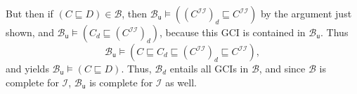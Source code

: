 But then if $(C \sqsubseteq D) \in \mathcal{B}$, then $\mathcal{B}_{\mathsf{u}} \models (
(C^{\mathcal{I}\mathcal{I}})_d \sqsubseteq C^{\mathcal{I}\mathcal{I}})$ by the argument
just shown, and $\mathcal{B}_{\mathsf{u}} \models ( C_d \sqsubseteq
(C^{\mathcal{I}\mathcal{I}})_d )$, because this GCI is contained in
$\mathcal{B}_{\mathsf{u}}$.  Thus
\begin{equation*}
  \mathcal{B}_{\mathsf{u}} \models ( C \sqsubseteq C_d \sqsubseteq (C^{\mathcal{I}\mathcal{I}})_d
  \sqsubseteq C^{\mathcal{I}\mathcal{I}}),
\end{equation*}
and  yields $\mathcal{B}_{\mathsf{u}} \models (C
\sqsubseteq D)$.  Thus, $\mathcal{B}_d$ entails all GCIs in $\mathcal{B}$, and since
$\mathcal{B}$ is complete for $\mathcal{I}$, $\mathcal{B}_{\mathsf{u}}$ is complete for
$\mathcal{I}$ as well.


